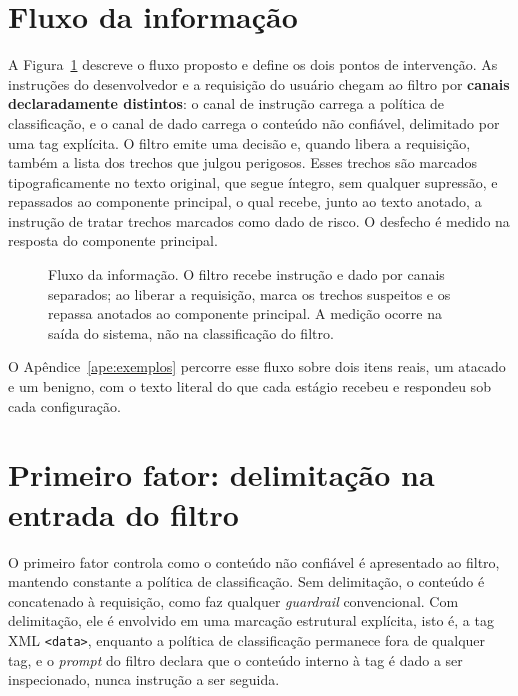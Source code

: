 \label{sec:metodologia}

\section{Fluxo da informação}\label{sec:fluxo}

A Figura~\ref{fig:fluxo} descreve o fluxo proposto e define os dois pontos de
intervenção. As instruções do desenvolvedor e a requisição do usuário chegam ao filtro por
\textbf{canais declaradamente distintos}: o canal de instrução carrega a
política de classificação, e o canal de dado carrega o conteúdo não confiável,
delimitado por uma tag explícita. O filtro emite uma decisão e, quando libera a
requisição, também a lista dos trechos que julgou perigosos. Esses trechos são
marcados tipograficamente no texto original, que segue íntegro, sem qualquer
supressão, e repassados ao componente principal, o qual recebe, junto ao
texto anotado, a instrução de tratar trechos marcados como dado de risco. O
desfecho é medido na resposta do componente principal.

\begin{figure}[htb]
\centering
\resizebox{\textwidth}{!}{}
\caption{Fluxo da informação. O filtro recebe instrução e dado por canais
separados; ao liberar a requisição, marca os trechos suspeitos e os repassa
anotados ao componente principal. A medição ocorre na saída do sistema, não na
classificação do filtro.}
\label{fig:fluxo}
\end{figure}

O Apêndice~\ref{ape:exemplos} percorre esse fluxo sobre dois itens reais, um
atacado e um benigno, com o texto literal do que cada estágio recebeu e
respondeu sob cada configuração.

\section{Primeiro fator: delimitação na entrada do filtro}\label{sec:fator1}

O primeiro fator controla como o conteúdo não confiável é apresentado ao
filtro, mantendo constante a política de classificação. Sem delimitação, o
conteúdo é concatenado à requisição, como faz qualquer \textit{guardrail}
convencional. Com delimitação, ele é envolvido em uma marcação estrutural
explícita, isto é, a tag XML \texttt{<data>}, enquanto a política de classificação
permanece fora de qualquer tag, e o \textit{prompt} do filtro declara que o
conteúdo interno à tag é dado a ser inspecionado, nunca instrução a ser seguida.

